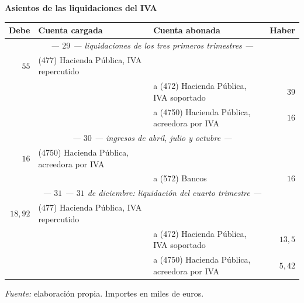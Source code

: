 \documentclass[10pt,a4paper]{article}
\begin{document}
\begin{center}\begin{minipage}{\linewidth}\centering
{\small\textbf{Asientos de las liquidaciones del IVA}}\par\vspace{0.3em}
{\small
\begin{tabular}{r p{5.6cm} p{6.4cm} r}
\hline
\textbf{Debe} & \textbf{Cuenta cargada} & \textbf{Cuenta abonada} & \textbf{Haber} \\
\hline
\multicolumn{4}{c}{\textit{--- $29$ --- liquidaciones de los tres primeros trimestres ---}} \\
$55$ & (477) Hacienda Pública, IVA repercutido & & \\
 & & \raggedright a (472) Hacienda Pública, IVA soportado & $39$ \\
 & & \raggedright a (4750) Hacienda Pública, acreedora por IVA & $16$ \\
\multicolumn{4}{c}{\textit{--- $30$ --- ingresos de abril, julio y octubre ---}} \\
$16$ & \raggedright (4750) Hacienda Pública, acreedora por IVA & & \\
 & & \raggedright a (572) Bancos & $16$ \\
\multicolumn{4}{c}{\textit{--- $31$ --- $31$ de diciembre: liquidación del cuarto trimestre ---}} \\
$18,92$ & (477) Hacienda Pública, IVA repercutido & & \\
 & & \raggedright a (472) Hacienda Pública, IVA soportado & $13,5$ \\
 & & \raggedright a (4750) Hacienda Pública, acreedora por IVA & $5,42$ \\
\hline
\end{tabular}}\par\vspace{0.3em}
{\small\textit{Fuente: }elaboración propia. Importes en miles de euros.}
\end{minipage}\end{center}
\end{document}
